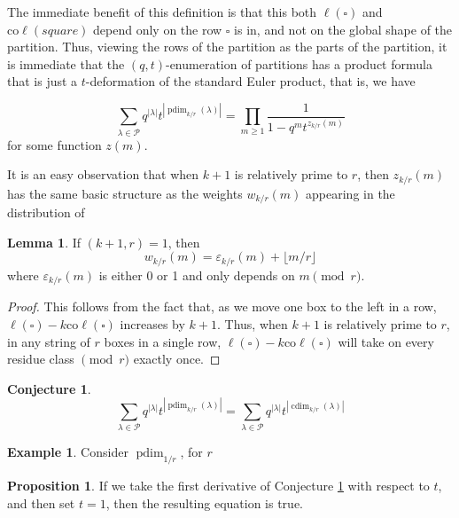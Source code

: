 \documentclass{amsart}[12pt]
\theoremstyle{definition}
\newtheorem{lemma}[dummy]{Lemma}
\newtheorem{example}[dummy]{Example}
\newtheorem{proposition}[dummy]{Proposition}
\newtheorem{conjecture}[dummy]{Conjecture}
\newcommand{\PP}{\mathcal{P}} %
\newcommand{\coleg}{\text{co}\ell}
\DeclareMathOperator{\dusty}{pdim}
\DeclareMathOperator{\cdim}{cdim}
\begin{document}
The immediate benefit of this definition is that this both $\ell(\square)$ and $\coleg(square)$ depend only on the row $\square$ is in, and not on the global shape of the partition.  Thus, viewing the rows of the partition as the parts of the partition, it is immediate that the $(q,t)$-enumeration of partitions has a product formula that is just a $t$-deformation of the standard Euler product, that is, we have

$$\sum_{\lambda\in \PP} q^{|\lambda|} t^{|\dusty_{k/r}(\lambda)|}=\prod_{m\geq 1} \frac{1}{1-q^mt^{z_{k/r}(m)}}$$
for some function $z(m)$.

It is an easy observation that when $k+1$ is relatively prime to $r$, then $z_{k/r}(m)$ has the same basic structure as the weights $w_{k/r}(m)$ appearing in the distribution of 

\begin{lemma} \label{lem:dusty-lemma}
If $(k+1,r)=1$, then 
$$w_{k/r}(m)=\varepsilon_{k/r}(m)+\lfloor m/r\rfloor$$
where $\varepsilon_{k/r}(m)$ is either 0 or 1 and only depends on $m\pmod r$.
\end{lemma}

\begin{proof}
This follows from the fact that, as we move one box to the left in a row, $\ell(\square)-k\coleg(\square)$ increases by $k+1$.  Thus, when $k+1$ is relatively prime to $r$, in any string of $r$ boxes in a single row, $\ell(\square)-k\coleg(\square)$ will take on every residue class $\pmod r$ exactly once. 
\end{proof}

\begin{conjecture} \label{conj:dusty}
$$\sum_{\lambda\in \PP} q^{|\lambda|} t^{|\dusty_{k/r}(\lambda)|}=\sum_{\lambda\in \PP} q^{|\lambda|} t^{|\cdim_{k/r}(\lambda)|}$$
\end{conjecture}


\begin{example}
Consider $\dusty_{1/r}$, for $r$ 

\end{example}


\begin{proposition}
If we take the first derivative of Conjecture \ref{conj:dusty} with respect to $t$, and then set $t=1$, then the resulting equation is true.  
\end{proposition}
\end{document}
